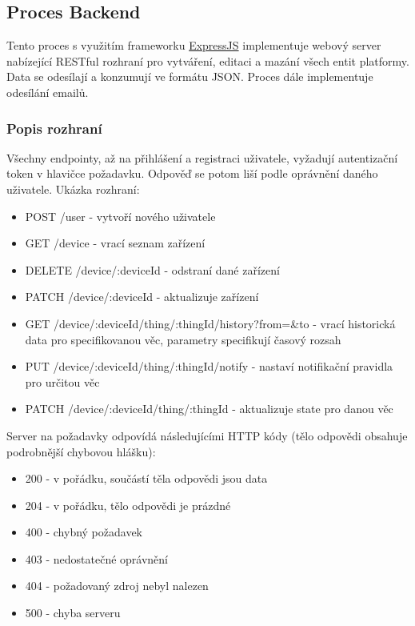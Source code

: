 \subsection{Proces Backend}
Tento proces s využitím frameworku \hyperref[expressjs]{ExpressJS} implementuje webový server nabízející RESTful rozhraní pro vytváření, editaci a mazání všech entit platformy. Data se odesílají a konzumují ve formátu JSON. Proces dále implementuje odesílání emailů.

\subsubsection{Popis rozhraní}
Všechny endpointy, až na přihlášení a registraci uživatele, vyžadují autentizační token v hlavičce požadavku. Odpověď se potom liší podle oprávnění daného uživatele. Ukázka rozhraní:
\begin{itemize}
    \item POST /user - vytvoří nového uživatele
    \item GET /device - vrací seznam zařízení
    \item DELETE /device/:deviceId - odstraní dané zařízení
    \item PATCH /device/:deviceId - aktualizuje zařízení
    \item GET /device/:deviceId/thing/:thingId/history?from=\&to - vrací historická data pro specifikovanou věc, parametry specifikují časový rozsah
    \item PUT /device/:deviceId/thing/:thingId/notify - nastaví notifikační pravidla pro určitou věc
    \item PATCH /device/:deviceId/thing/:thingId - aktualizuje state pro danou věc
\end{itemize}

Server na požadavky odpovídá následujícími HTTP kódy (tělo odpovědi obsahuje podrobnější chybovou hlášku):
\begin{itemize}
    \item 200 - v pořádku, součástí těla odpovědi jsou data
    \item 204 - v pořádku, tělo odpovědi je prázdné
    \item 400 - chybný požadavek
    \item 403 - nedostatečné oprávnění
    \item 404 - požadovaný zdroj nebyl nalezen
    \item 500 - chyba serveru
\end{itemize}


